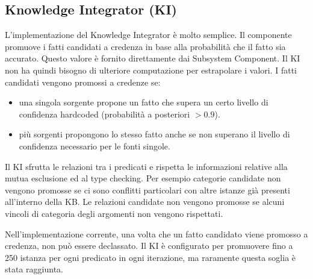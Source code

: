 \subsection{Knowledge Integrator (KI)}
L'implementazione del Knowledge Integrator è molto semplice. Il componente promuove i fatti candidati a credenza in base alla probabilità che il fatto sia accurato. Questo valore è fornito direttamente dai Subsystem Component. Il KI non ha quindi bisogno di ulteriore computazione per estrapolare i valori.
I fatti candidati vengono promossi a credenze se:
\begin{itemize}
	\item una singola sorgente propone un fatto che supera un certo livello di confidenza hardcoded (probabilità a posteriori $> 0.9$).
	\item più sorgenti propongono lo stesso fatto anche se non superano il livello di confidenza necessario per le fonti singole.
\end{itemize}
Il KI sfrutta le relazioni tra i predicati e rispetta le informazioni relative alla mutua esclusione ed al type checking. Per esempio categorie candidate non vengono promosse se ci sono conflitti particolari con altre istanze già presenti all'interno della KB.
Le relazioni candidate non vengono promosse se alcuni vincoli di categoria degli argomenti non vengono rispettati.

\noindent Nell'implementazione corrente, una volta che un fatto candidato viene promosso a credenza, non può essere declassato. Il KI è configurato per promuovere fino a 250 istanza per ogni predicato in ogni iterazione, ma raramente questa soglia è stata raggiunta.
\newpage